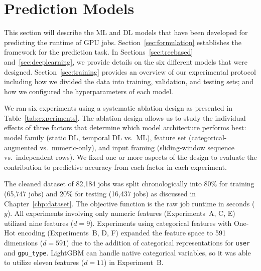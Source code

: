\chapter{Prediction Models}\label{chp:prediction}

This section will describe the ML and DL models that have been developed for predicting the runtime of GPU jobs. Section~\ref{sec:formulation} establishes the framework for the prediction task. In Sections~\ref{sec:treebased} and~\ref{sec:deeplearning}, we provide details on the six different models that were designed. Section~\ref{sec:training} provides an overview of our experimental protocol including how we divided the data into training, validation, and testing sets; and how we configured the hyperparameters of each model.

We ran six experiments using a systematic ablation design as presented in Table~\ref{tab:experiments}. The ablation design allows us to study the individual effects of three factors that determine which model architecture performs best: model family (static DL, temporal DL vs.\ ML), feature set (categorical-augmented vs.\ numeric-only), and input framing (sliding-window sequence vs.\ independent rows). We fixed one or more aspects of the design to evaluate the contribution to predictive accuracy from each factor in each experiment.

The cleaned dataset of 82,184 jobs was split chronologically into 80\% for training (65,747 jobs) and 20\% for testing (16,437 jobs) as discussed in Chapter~\ref{chp:dataset}. The objective function is the raw job runtime in seconds ($y$). All experiments involving only numeric features (Experiments~A, C, E) utilized nine features ($d=9$). Experiments using categorical features with One-Hot encoding (Experiments~B, D, F) expanded the feature space to 591 dimensions ($d=591$) due to the addition of categorical representations for \texttt{user} and \texttt{gpu\_type}. LightGBM can handle native categorical variables, so it was able to utilize eleven features ($d=11$) in Experiment~B.

